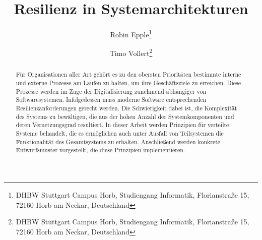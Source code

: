 \documentclass[]{lni}
\begin{document}
\title[Resilienz in Systemarchitekturen]{Resilienz in Systemarchitekturen}


\author[Robin Epple \and Timo Vollert]
{Robin Epple\footnote{DHBW Stuttgart Campus Horb, Studiengang Informatik, Florianstraße 15, 72160 Horb am Neckar,
Deutschland } \and
Timo Vollert\footnote{DHBW Stuttgart Campus Horb, Studiengang Informatik, Florianstraße 15, 72160 Horb am Neckar,
Deutschland }}


\maketitle


\begin{abstract}
Für Organisationen aller Art gehört es zu den obersten Prioritäten bestimmte interne und externe Prozesse am Laufen zu halten, um ihre Geschäftsziele zu erreichen. 
Diese Prozesse werden im Zuge der Digitalisierung zunehmend abhängiger von Softwaresystemen. Infolgedessen muss moderne Software entsprechenden Resilienzanforderungen gerecht werden.
Die Schwierigkeit dabei ist, die Komplexität des Systems zu bewältigen, die aus der hohen Anzahl der Systemkomponenten und deren Vernetzungsgrad resultiert.
In dieser Arbeit werden Prinzipien für verteilte Systeme behandelt, die es ermöglichen auch unter Ausfall von Teilsystemen die Funktionalität des Gesamtsystems zu erhalten.
Anschließend werden konkrete Entwurfsmuster vorgestellt, die diese Prinzipien implementieren.
\end{abstract}

\end{document}
